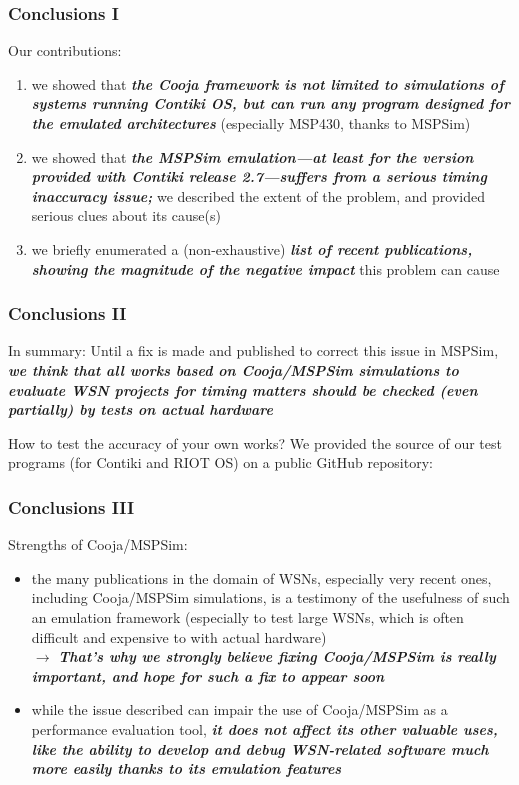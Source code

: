 \documentclass[10pt,c]{beamer}
\renewcommand{\emph}[1]{\textbf{\textit{#1}}}
\begin{document}
\begin{frame}
\frametitle{Conclusions I}
\begin{block}{Our contributions:}
\begin{enumerate}
\item we showed that \emph{the Cooja framework is not limited to simulations
of systems running Contiki OS, but can run any program designed for the
emulated architectures} (especially MSP430, thanks to MSPSim)
\item we showed that \emph{the MSPSim emulation---at least for the version
provided with Contiki release 2.7---suffers from a serious timing inaccuracy
issue;} we described the extent of the problem, and provided serious clues
about its cause(s)
\item we briefly enumerated a (non-exhaustive) \emph{list of recent
publications, showing the magnitude of the negative impact}
this problem can cause
\end{enumerate}
\end{block}
\end{frame}

\begin{frame}
\frametitle{Conclusions II}
\begin{alertblock}{In summary:}
Until a fix is made and published to correct this issue in MSPSim,
\emph{we think that all works based on Cooja/MSPSim simulations to evaluate
WSN projects for timing matters should be checked (even partially) by tests
on actual hardware}
\end{alertblock}
\begin{exampleblock}{How to test the accuracy of your own works?}
We provided the source of our test programs (for Contiki and RIOT OS)
on a public GitHub repository:
\end{exampleblock}
\end{frame}

\begin{frame}
\frametitle{Conclusions III}
\begin{exampleblock}{Strengths of Cooja/MSPSim:}
\begin{itemize}
\item the many publications in the domain of WSNs, especially very recent
ones, including Cooja/MSPSim simulations, is a testimony of the usefulness
of such an emulation framework (especially to test large WSNs, which is
often difficult and expensive to with actual hardware) \\
$\rightarrow$ \emph{That's why we strongly believe fixing Cooja/MSPSim
is really important, and hope for such a fix to appear soon}
\item while the issue described can impair the use of Cooja/MSPSim as
a performance evaluation tool, \emph{it does not affect its other
valuable uses, like the ability to develop and debug WSN-related
software much more easily thanks to its emulation features}
\end{itemize}
\end{exampleblock}
\end{frame}
\end{document}
